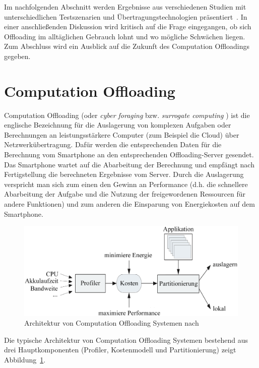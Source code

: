 \documentclass{sigchi}
\begin{document}
Im nachfolgenden Abschnitt werden Ergebnisse aus verschiedenen Studien mit unterschiedlichen Testszenarien und Übertragungstechnologien präsentiert~\cite{o2, o8, o12, thinkair}.
In einer anschließenden Diskussion wird kritisch auf die Frage eingegangen, ob sich Offloading im alltäglichen Gebrauch lohnt und wo mögliche Schwächen liegen.
Zum Abschluss wird ein Ausblick auf die Zukunft des Computation Offloadings gegeben.

\section{Computation Offloading}

Computation Offloading (oder \emph{cyber foraging} bzw. \emph{surrogate computing} \cite{o4}) ist die englische Bezeichnung für die Auslagerung von komplexen Aufgaben oder Berechnungen an leistungsstärkere Computer (zum Beispiel die Cloud) über Netzwerkübertragung.
Dafür werden die entsprechenden Daten für die Berechnung vom Smartphone an den entsprechenden Offloading-Server gesendet.
Das Smartphone wartet auf die Abarbeitung der Berechnung und empfängt nach Fertigstellung die berechneten Ergebnisse vom Server.
Durch die Auslagerung verspricht man sich zum einen den Gewinn an Performance (d.h. die schnellere Abarbeitung der Aufgabe und die Nutzung der freigewordenen Ressourcen für andere Funktionen) und zum anderen die Einsparung von Energiekosten auf dem Smartphone.

\begin{figure}
\centering
  \includegraphics[width=1.0\columnwidth]{images/architektur}
  \caption{Architektur von Computation Offloading Systemen nach~\protect\cite{O13}}\label{fig:architektur}
\end{figure}

Die typische Architektur von Computation Offloading Systemen bestehend aus drei Hauptkomponenten (Profiler, Kostenmodell und Partitionierung) zeigt Abbildung~\ref{fig:architektur}.
\end{document}
